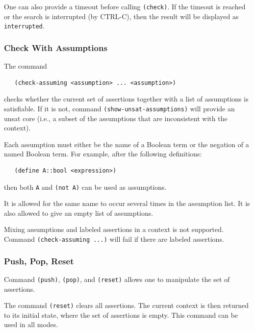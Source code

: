 \documentclass[11pt,twoside,fleqn,openright,titlepage]{cslreport}
\begin{document}
\medskip\noindent One can also provide a timeout before calling
\texttt{(check)}. If the timeout is reached or the search is
interrupted (by CTRL-C), then the result will be displayed as
\texttt{interrupted}.

\subsubsection*{Check With Assumptions}

The command
\begin{small}
\begin{verbatim}
   (check-assuming <assumption> ... <assumption>)
\end{verbatim}
\end{small}
checks whether the current set of assertions together with a list of
assumptions is satisfiable. If it is not, command
\texttt{(show-unsat-assumptions)} will provide an unsat core (i.e., a
subset of the assumptions that are inconsistent with the context).

\medskip\noindent
Each assumption must either be the name of a Boolean term or the
negation of a named Boolean term.  For example, after the following
definitions:
\begin{small}
\begin{verbatim}
   (define A::bool <expression>)
\end{verbatim}
\end{small}
then both \texttt{A} and \texttt{(not A)} can be used as assumptions.

\medskip\noindent
It is allowed for the same name to occur several times in the
assumption list. It is also allowed to give an empty list of
assumptions.

\medskip\noindent
Mixing assumptions and labeled assertions in a context is not
supported. Command \texttt{(check-assuming ...)} will fail if there
are labeled assertions.

\subsubsection*{Push, Pop, Reset}

Command \texttt{(push)}, \texttt{(pop)}, and \texttt{(reset)} allows
one to manipulate the set of assertions.

\medskip\noindent
The command \texttt{(reset)} clears all assertions. The current
context is then returned to its initial state, where the set of
assertions is empty. This command can be used in all modes.
\end{document}
